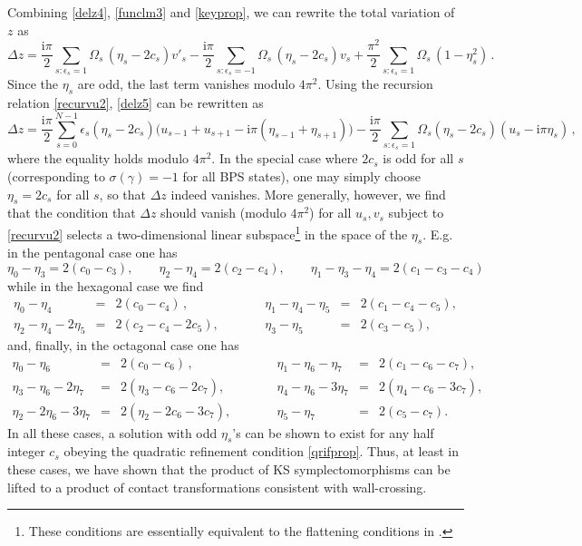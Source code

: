 \documentclass[12pt,reqno]{article}
\numberwithin{equation}{section}
\newcommand{\be}{\begin{equation}}
\newcommand{\ee}{\end{equation}}
\def\eps{\varepsilon}
\newcommand{\I}{\mathrm{i}}
\def\eps{\epsilon}
\numberwithin{equation}{section}
\begin{document}
Combining \eqref{delz4}, \eqref{funclm3} and \eqref{keyprop},
we can rewrite the total variation of $z$ as
\be
\label{delz5}
\Delta z = \frac{\I\pi}{2}  \sum_{s: \eps_s=1}  \Omega_s \, (\eta_s-2c_s) v'_s
- \frac{\I\pi}{2}  \sum_{s: \eps_s=-1} \Omega_s\, (\eta_s-2c_s) v_s
+ \frac{\pi^2}{2}  \sum_{s: \eps_s=1}  \Omega_s \, (1-\eta_s^2)\, .
\ee
Since the $\eta_s$ are odd, the last term vanishes modulo $4\pi^2$. Using
the recursion relation \eqref{recurvu2}, \eqref{delz5} can be rewritten as
\be
\Delta z
=\frac{\I\pi}{2}   \sum_{s=0}^{N-1} \eps_s
(\eta_s-2c_s) \big( u_{s-1}+u_{s+1} -\I\pi (\eta_{s-1}+\eta_{s+1}) \big)
-\frac{\I\pi}{2} \sum_{s: \eps_s=1} \Omega_s (\eta_s-2c_s) (u_s - \I\pi \eta_s)\, ,
\ee
where the equality holds modulo $4\pi^2$.
In the special case where $2c_s$ is odd for all $s$ (corresponding to $\sigma(\gamma)=-1$
for all BPS states), one may simply choose $\eta_s=2c_s$ for
all $s$, so that $\Delta z$ indeed vanishes. More generally, however,
we find that the condition that
$\Delta z$ should vanish (modulo $4\pi^2$)
for all $u_s, v_s$ subject to \eqref{recurvu2} selects
a two-dimensional linear subspace\footnote{These conditions are essentially
equivalent to the flattening conditions in \cite{MR2033484,MR2350461}.}
in the space of the $\eta_s$. E.g.
in the pentagonal case one has
\be
\eta_0-\eta_3=2(c_0-c_3) ,
\qquad
\eta_2-\eta_4=2(c_2-c_4) ,
\qquad
\eta_1-\eta_3-\eta_4=2(c_1-c_3-c_4)
\ee
while in the hexagonal case we find
\be
\begin{array}{rclcrcl}
\eta_0-\eta_4&=&2(c_0-c_4)\, ,
&\qquad &
\eta_1-\eta_4-\eta_5&=&2(c_1-c_4-c_5) ,
\\
\eta_2-\eta_4-2\eta_5&=&2(c_2-c_4-2c_5) ,
&\qquad &
\eta_3-\eta_5&=&2(c_3-c_5) ,
\end{array}
\ee
and, finally, in the octagonal case one has
\be
\begin{array}{rclcrcl}
\eta_0-\eta_6&=&2(c_0-c_6)\, ,
&\qquad &
\eta_1-\eta_6-\eta_7&=&2(c_1-c_6-c_7),
\\
\eta_3-\eta_6-2\eta_7&=&2(\eta_3-c_6-2c_7) ,
&\qquad &
\eta_4-\eta_6-3\eta_7&=&2(\eta_4-c_6-3c_7) ,
\\
\eta_2-2\eta_6-3\eta_7&=&2(\eta_2-2c_6-3c_7),
&\qquad &
\eta_5-\eta_7&=&2(c_5-c_7).
\end{array}
\ee
In all these cases, a solution with odd $\eta_s$'s can be shown to exist for any half integer $c_s$
obeying the  quadratic refinement condition \eqref{qrifprop}. Thus,  at least in these cases, we
have shown that the product of KS symplectomorphisms can be lifted to a product
of contact transformations consistent with wall-crossing.
\end{document}
